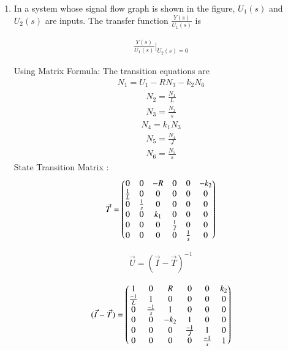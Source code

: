 \begin{enumerate}[label=\thesection.\arabic*.,ref=\thesection.\theenumi]
\item In a system whose signal flow graph is shown in the figure, $U_1(s)$ and $U_2(s)$ are inputs. The transfer function $\frac{Y(s)}{U_1(s)}$ is


\begin{figure}[!ht]
\begin{center}
		
		\resizebox{\columnwidth}{!}{}
	\end{center}
\end{figure}


\solution 
\begin{align}
    \frac{Y(s)}{U_1(s)}\Biggr|_{U_2(s)=0}
\end{align}

Using Matrix Formula:
\newline
The transition equations are
\begin{align}
    N_1 = U_1-RN_3-k_2N_6  
\end{align}
\begin{align}
    N_2=\frac{N_1}{L}
\end{align}
\begin{align}
    N_3=\frac{N_2}{s}
\end{align}
\begin{align}
    N_4=k_1N_3
\end{align}
\begin{align}
    N_5=\frac{N_4}{J}
\end{align}
\begin{align}
    N_6=\frac{N_5}{s}
\end{align}
State Transition Matrix :
\begin{align}
    \Vec{T} = \begin{pmatrix}0 & 0 & -R & 0 & 0 & -k_2\\
    \frac{1}{L} & 0 & 0 & 0 & 0 & 0\\
    0 & \frac{1}{s} & 0 & 0 & 0 & 0\\
    0 & 0 & k_1 & 0 & 0 & 0\\
    0 & 0 & 0 & \frac{1}{J} & 0 & 0\\
    0 & 0 & 0 & 0 & \frac{1}{s} & 0\end{pmatrix}
\end{align}    

\begin{align}
    \Vec{U} = {(\Vec{I}-\Vec{T})^-}^1
\end{align}

\begin{align}
    (\Vec{I}-\Vec{T}) = \begin{pmatrix}1 & 0 & R & 0 & 0 & k_2\\
    \frac{-1}{L} & 1 & 0 & 0 & 0 & 0\\
    0 & \frac{-1}{s} & 1 & 0 & 0 & 0\\
    0 & 0 & -k_2 & 1 & 0 & 0\\
    0 & 0 & 0 & \frac{-1}{J} & 1 & 0\\
    0 & 0 & 0 & 0& \frac{-1}{s} & 1 \end{pmatrix} 
\end{align}


\end{enumerate}
